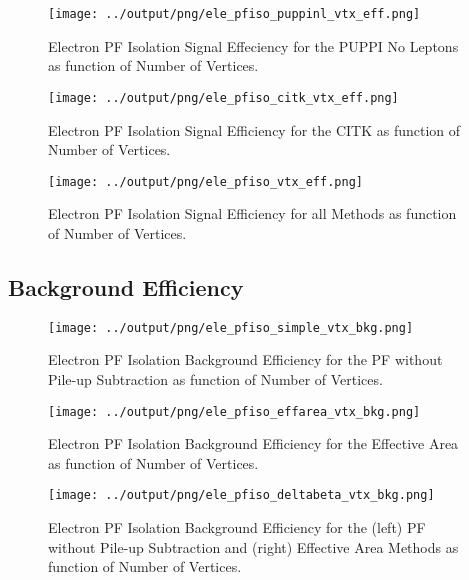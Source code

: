 \documentclass[11pt]{book}
\begin{document}
\begin{figure}[htb]
\centering
\texttt{[image: ../output/png/ele\_pfiso\_puppinl\_vtx\_eff.png]}
\caption{Electron PF Isolation Signal Effeciency for the PUPPI No Leptons as function of Number of Vertices.}
\label{fig:ele_pfiso_vtx_eff_puppinl}
\end{figure}

\begin{figure}[htb]
\centering
\texttt{[image: ../output/png/ele\_pfiso\_citk\_vtx\_eff.png]}
\caption{Electron PF Isolation Signal Efficiency for the CITK as function of Number of Vertices.}
\label{fig:ele_pfiso_vtx_eff_citk}
\end{figure}

\begin{figure}[htb]
\centering
\texttt{[image: ../output/png/ele\_pfiso\_vtx\_eff.png]}
\caption{Electron PF Isolation Signal Efficiency for all Methods as function of Number of Vertices.}
\label{fig:ele_pfiso_vtx_eff}
\end{figure}
\clearpage

\subsection{Background Efficiency}
\begin{figure}[htb]
\centering
\texttt{[image: ../output/png/ele\_pfiso\_simple\_vtx\_bkg.png]}
\caption{Electron PF Isolation Background Efficiency for the PF without Pile-up Subtraction as function of Number of Vertices.}
\label{fig:ele_pfiso_vtx_bkg_simple}
\end{figure}

\begin{figure}[htb]
\centering
\texttt{[image: ../output/png/ele\_pfiso\_effarea\_vtx\_bkg.png]}
\caption{Electron PF Isolation Background Efficiency for the Effective Area as function of Number of Vertices.}
\label{fig:ele_pfiso_vtx_bkg_effarea}
\end{figure}

\begin{figure}[htb]
\centering
\texttt{[image: ../output/png/ele\_pfiso\_deltabeta\_vtx\_bkg.png]}
\caption{Electron PF Isolation Background Efficiency for the (left) PF without Pile-up Subtraction and (right) Effective Area Methods as function of Number of Vertices.}
\label{fig:ele_pfiso_vtx_bkg_deltabeta}
\end{figure}
\end{document}
